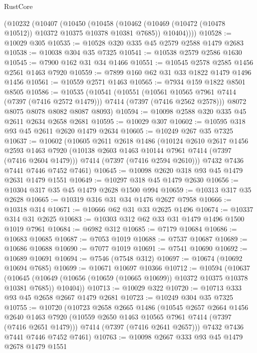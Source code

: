 \begin{lexlean}{RustCore}
\begin{coremodule}
    (@10232
      (@10407
        (@10450
          (@10458
            (@10462 (@10469 (@10472 (@10478 @10512)) @10372 @10375 @10378 @10381 @7685))
            @10404))))
@10528 := @10029 @305
@10535 := @10528 @320 @335 @45 @2579 @2588 @1479 @2683
@10538 := @10038 @304 @35 @7325
@10541 := @10538 @2579 @2586 @1630
@10545 := @7900 @162 @31 @34 @1466
@10551 := @10545 @2578 @2585 @1456 @2561 @1463 @7920
@10559 := @7899 @160 @62 @31 @33 @1822 @1479 @1496 @1456
@10561 := @10559 @2571 @1463
@10565 := @7934 @159 @1822 @8501 @8505
@10586 := @10535
    (@10541
      (@10551
        (@10561 @10565 @7961 @7414 (@7397 (@7416 @2572 @1479)))
        @7414
        (@7397 (@7416 @2562 @2578)))
      @8072
      @8075
      @8078
      @8082
      @8087
      @8093)
@10594 := @10098 @2588 @320 @335 @45 @2611 @2634 @2658 @2681
@10595 := @10029 @307
@10602 := @10595 @318 @93 @45 @2611 @2620 @1479 @2634
@10605 := @10249 @267 @35 @7325
@10637 := @10602
    (@10605
      @2611
      @2618
      @1486
      (@10124
        @2610
        @2617
        @1456
        @2593
        @1463
        @7920
        (@10138 @2603 @1463 @10144 @7961 @7414 (@7397 (@7416 @2604 @1479)))
        @7414
        (@7397 (@7416 @2594 @2610)))
      @7432
      @7436
      @7441
      @7446
      @7452
      @7461)
@10645 := @10098 @2620 @318 @93 @45 @1479 @2631 @1479 @1551
@10649 := @10297 @318 @45 @1479 @2630
@10656 := @10304 @317 @35 @45 @1479 @2628 @1500 @994
@10659 := @10313 @317 @35 @2628
@10665 := @10319 @316 @31 @34 @1476 @2627 @7958
@10666 := @10318 @314
@10671 := @10666 @62 @31 @33 @2625 @1496
@10674 := @10337 @314 @31 @2625
@10683 := @10303 @312 @62 @33 @31 @1479 @1496 @1500 @1019 @7961
@10684 := @6982 @312
@10685 := @7179 @10684
@10686 := @10683 @10685
@10687 := @7053 @1019
@10688 := @7537 @10687
@10689 := @10686 @10688
@10690 := @7077 @1019
@10691 := @7541 @10690
@10692 := @10689 @10691
@10694 := @7546 (@7548 @312)
@10697 := @10674 (@10692 @10694 @7685)
@10699 := @10671 @10697 @10366
@10712 := @10594
    (@10637
      (@10645 (@10649 (@10656 (@10659 (@10665 @10699)) @10372 @10375 @10378 @10381 @7685)) @10404))
@10713 := @10029 @322
@10720 := @10713 @333 @93 @45 @2658 @2667 @1479 @2681
@10723 := @10249 @304 @35 @7325
@10755 := @10720
    (@10723
      @2658
      @2665
      @1486
      (@10545
        @2657
        @2664
        @1456
        @2640
        @1463
        @7920
        (@10559 @2650 @1463 @10565 @7961 @7414 (@7397 (@7416 @2651 @1479)))
        @7414
        (@7397 (@7416 @2641 @2657)))
      @7432
      @7436
      @7441
      @7446
      @7452
      @7461)
@10763 := @10098 @2667 @333 @93 @45 @1479 @2678 @1479 @1551

\end{coremodule}
\end{lexlean}
